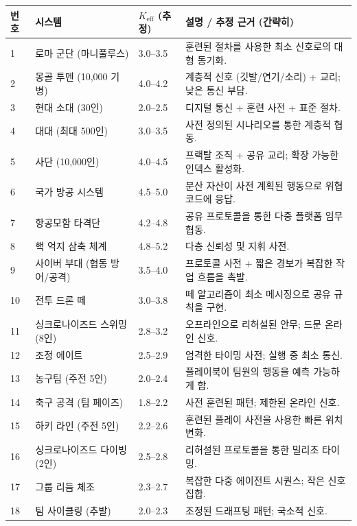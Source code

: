 \documentclass[13pt,a4paper]{article}
\begin{document}
	\begin{longtable}{|p{0.8cm}|p{6.2cm}|p{3.0cm}|p{5.7cm}|}
		\hline
		\textbf{번호} & \textbf{시스템} & \textbf{$K_{\mathrm{eff}}$ (추정)} & \textbf{설명 / 추정 근거 (간략히)} \\
		\hline
		\endhead
		1 & 로마 군단 (마니풀루스) & 3.0--3.5 & 훈련된 절차를 사용한 최소 신호로의 대형 동기화. \\
		\hline
		2 & 몽골 투멘 (10,000 기병) & 4.0--4.2 & 계층적 신호 (깃발/연기/소리) + 교리; 낮은 통신 부담. \\
		\hline
		3 & 현대 소대 (30인) & 2.0--2.5 & 디지털 통신 + 훈련 사전 + 표준 절차. \\
		\hline
		4 & 대대 (최대 500인) & 3.0--3.5 & 사전 정의된 시나리오를 통한 계층적 협동. \\
		\hline
		5 & 사단 (10,000인) & 4.0--4.5 & 프랙탈 조직 + 공유 교리; 확장 가능한 인덱스 활성화. \\
		\hline
		6 & 국가 방공 시스템 & 4.5--5.0 & 분산 자산이 사전 계획된 행동으로 위협 코드에 응답. \\
		\hline
		7 & 항공모함 타격단 & 4.2--4.8 & 공유 프로토콜을 통한 다중 플랫폼 임무 협동. \\
		\hline
		8 & 핵 억지 삼축 체계 & 4.8--5.2 & 다층 신뢰성 및 지휘 사전. \\
		\hline
		9 & 사이버 부대 (협동 방어/공격) & 3.5--4.0 & 프로토콜 사전 + 짧은 경보가 복잡한 작업 흐름을 촉발. \\
		\hline
		10 & 전투 드론 떼 & 3.0--3.8 & 떼 알고리즘이 최소 메시징으로 공유 규칙을 구현. \\
		\hline
		11 & 싱크로나이즈드 스위밍 (8인) & 2.8--3.2 & 오프라인으로 리허설된 안무; 드문 온라인 신호. \\
		\hline
		12 & 조정 에이트 & 2.5--2.9 & 엄격한 타이밍 사전; 실행 중 최소 통신. \\
		\hline
		13 & 농구팀 (주전 5인) & 2.0--2.4 & 플레이북이 팀원의 행동을 예측 가능하게 함. \\
		\hline
		14 & 축구 공격 (팀 페이즈) & 1.8--2.2 & 사전 훈련된 패턴; 제한된 온라인 신호. \\
		\hline
		15 & 하키 라인 (주전 5인) & 2.2--2.6 & 훈련된 플레이 사전을 사용한 빠른 위치 변화. \\
		\hline
		16 & 싱크로나이즈드 다이빙 (2인) & 2.5--2.8 & 리허설된 프로토콜을 통한 밀리초 타이밍. \\
		\hline
		17 & 그룹 리듬 체조 & 2.3--2.7 & 복잡한 다중 에이전트 시퀀스; 작은 신호 집합. \\
		\hline
		18 & 팀 사이클링 (추발) & 2.0--2.3 & 조정된 드래프팅 패턴; 국소적 신호. \\

\end{longtable}
\end{document}
